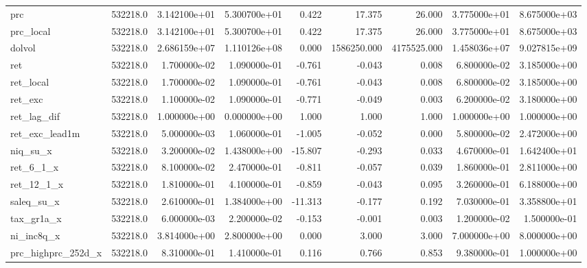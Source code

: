 \documentclass[12pt]{article}
\begin{document}
\begin{landscape}
\begin{longtable}{|l|r|r|r|r|r|r|r|r|}
		prc                      & 532218.0 & 3.142100e+01  & 5.300700e+01 & 0.422      & 17.375      & 26.000      & 3.775000e+01  & 8.675000e+03 \\
		prc\_local               & 532218.0 & 3.142100e+01  & 5.300700e+01 & 0.422      & 17.375      & 26.000      & 3.775000e+01  & 8.675000e+03 \\
		dolvol                   & 532218.0 & 2.686159e+07  & 1.110126e+08 & 0.000      & 1586250.000 & 4175525.000 & 1.458036e+07  & 9.027815e+09 \\
		ret                      & 532218.0 & 1.700000e-02  & 1.090000e-01 & -0.761     & -0.043      & 0.008       & 6.800000e-02  & 3.185000e+00 \\
		ret\_local               & 532218.0 & 1.700000e-02  & 1.090000e-01 & -0.761     & -0.043      & 0.008       & 6.800000e-02  & 3.185000e+00 \\
		ret\_exc                 & 532218.0 & 1.100000e-02  & 1.090000e-01 & -0.771     & -0.049      & 0.003       & 6.200000e-02  & 3.180000e+00 \\
		ret\_lag\_dif            & 532218.0 & 1.000000e+00  & 0.000000e+00 & 1.000      & 1.000       & 1.000       & 1.000000e+00  & 1.000000e+00 \\
		ret\_exc\_lead1m         & 532218.0 & 5.000000e-03  & 1.060000e-01 & -1.005     & -0.052      & 0.000       & 5.800000e-02  & 2.472000e+00 \\
		niq\_su\_x               & 532218.0 & 3.200000e-02  & 1.438000e+00 & -15.807    & -0.293      & 0.033       & 4.670000e-01  & 1.642400e+01 \\
		ret\_6\_1\_x             & 532218.0 & 8.100000e-02  & 2.470000e-01 & -0.811     & -0.057      & 0.039       & 1.860000e-01  & 2.811000e+00 \\
		ret\_12\_1\_x            & 532218.0 & 1.810000e-01  & 4.100000e-01 & -0.859     & -0.043      & 0.095       & 3.260000e-01  & 6.188000e+00 \\
		saleq\_su\_x             & 532218.0 & 2.610000e-01  & 1.384000e+00 & -11.313    & -0.177      & 0.192       & 7.030000e-01  & 3.358800e+01 \\
		tax\_gr1a\_x             & 532218.0 & 6.000000e-03  & 2.200000e-02 & -0.153     & -0.001      & 0.003       & 1.200000e-02  & 1.500000e-01 \\
		ni\_inc8q\_x             & 532218.0 & 3.814000e+00  & 2.800000e+00 & 0.000      & 3.000       & 3.000       & 7.000000e+00  & 8.000000e+00 \\
		prc\_highprc\_252d\_x    & 532218.0 & 8.310000e-01  & 1.410000e-01 & 0.116      & 0.766       & 0.853       & 9.380000e-01  & 1.000000e+00 \\

\end{longtable}
\end{landscape}
\end{document}
